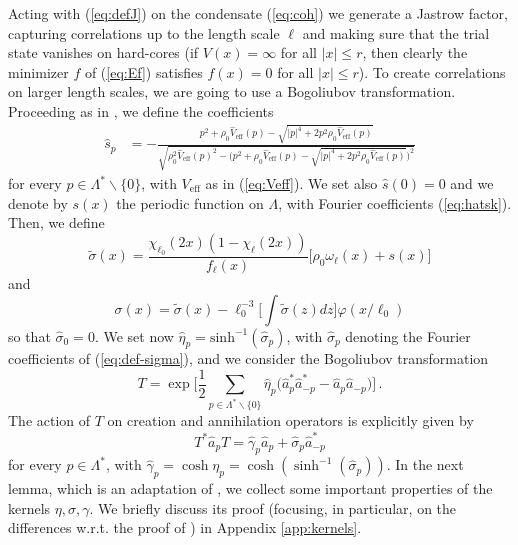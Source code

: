 \documentclass[a4paper,11pt]{article}
\def\ph{\varphi}
\numberwithin{equation}{section}
\begin{document}
Acting with (\ref{eq:defJ}) on the condensate (\ref{eq:coh}) we generate a Jastrow factor, capturing correlations up to the length scale $\ell$ and making sure that the trial state vanishes on hard-cores (if $V (x) = \infty$ for all $|x| \leq r$, then clearly the minimizer $f$ of (\ref{eq:Ef}) satisfies $f(x) = 0$ for all $|x| \leq r$). To create correlations on larger length scales, we are going to use a Bogoliubov transformation. Proceeding as in \cite{BBCOS}, we define the coefficients \begin{equation}\label{eq:hatsk} \begin{split} 
\widehat{s}_p &= - \frac{p^2 + \rho_0 \widehat{V}_\text{eff} (p) -  \sqrt{|p|^4 + 2p^2 \rho_0 \widehat{V}_\text{eff} (p)}}{\sqrt{\rho_0^2 \widehat{V}_\text{eff} (p)^2 - \Big( p^2 + \rho_0 \widehat{V}_\text{eff} (p) -  \sqrt{|p|^4 + 2p^2 \rho_0 \widehat{V}_\text{eff} (p)}\Big)^2}}
\end{split} 
\end{equation}
for every $p \in \Lambda^* \backslash \{ 0 \}$, with $V_\mathrm{eff}$ as in (\ref{eq:Veff}). We set also $\widehat{s} (0) = 0$ and we denote by $s(x)$ the periodic function on $\Lambda$, with Fourier coefficients (\ref{eq:hatsk}). Then, we define  
\begin{equation}\label{eq:tlsigma} \tilde{\sigma} (x) = \frac{\chi_{\ell_0} (2x) (1- \chi_\ell (2x))}{f_\ell (x)} \big[ \rho_0 \omega_\ell (x) + s (x) \big] \end{equation} 
and 
\begin{equation}
\label{eq:def-sigma} \sigma (x) = \tilde{\sigma} (x) - \ell_0^{-3} \Big[ \int \tilde{\sigma} (z) dz \Big]  \ph (x/\ell_0) 
\end{equation} 
so that $\widehat{\sigma}_0 = 0$. We set now $\widehat{\eta}_p = \mathrm{sinh}^{-1} (\widehat{\sigma}_p)$, with $\widehat{\sigma}_p$ denoting the Fourier coefficients of (\ref{eq:def-sigma}), and we consider the Bogoliubov transformation 
\begin{equation}\label{eq:def-bog} T = \exp \Big[ \frac{1}{2} \sum_{p \in \Lambda^* \backslash \{ 0 \}} \widehat{\eta}_p \big( \hat{a}_p^* \hat{a}_{-p}^* - \hat{a}_p \hat{a}_{-p} \big) \Big] \,. \end{equation} 
The action of $T$ on creation and annihilation operators is explicitly given by 
\[ T^* \hat{a}_p T = \widehat{\gamma}_p \hat{a}_p + \widehat{\sigma}_p \hat{a}_{-p}^* \]
for every $p \in \Lambda^*$, with $\widehat{\gamma}_p = \cosh \eta_p = \cosh (\sinh^{-1} (\widehat{\sigma}_p))$. In the next lemma, which is an adaptation of \cite[Lemma 2.2]{BBCOS}, we collect some important properties of the kernels $\eta, \sigma, \gamma$. We briefly discuss its proof (focusing, in particular, on the differences w.r.t. the proof of \cite[Lemma 2.2]{BBCOS}) in Appendix \ref{app:kernels}. 
\end{document}
